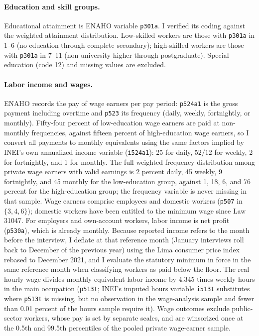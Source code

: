 \paragraph{Education and skill groups.} Educational attainment is ENAHO variable \texttt{p301a}. I verified its coding against the weighted attainment distribution. Low-skilled workers are those with \texttt{p301a} in 1--6 (no education through complete secondary); high-skilled workers are those with \texttt{p301a} in 7--11 (non-university higher through postgraduate). Special education (code 12) and missing values are excluded.

\paragraph{Labor income and wages.} ENAHO records the pay of wage earners per pay period: \texttt{p524a1} is the gross payment including overtime and \texttt{p523} its frequency (daily, weekly, fortnightly, or monthly). Fifty-four percent of low-education wage earners are paid at non-monthly frequencies, against fifteen percent of high-education wage earners, so I convert all payments to monthly equivalents using the same factors implied by INEI's own annualized income variable (\texttt{i524a1}): 25 for daily, $52/12$ for weekly, 2 for fortnightly, and 1 for monthly. The full weighted frequency distribution among private wage earners with valid earnings is 2 percent daily, 45 weekly, 9 fortnightly, and 45 monthly for the low-education group, against 1, 18, 6, and 76 percent for the high-education group; the frequency variable is never missing in that sample. Wage earners comprise employees and domestic workers (\texttt{p507} in $\{3,4,6\}$); domestic workers have been entitled to the minimum wage since Law 31047. For employers and own-account workers, labor income is net profit (\texttt{p530a}), which is already monthly. Because reported income refers to the month before the interview, I deflate at that reference month (January interviews roll back to December of the previous year) using the Lima consumer price index rebased to December 2021, and I evaluate the statutory minimum in force in the same reference month when classifying workers as paid below the floor. The real hourly wage divides monthly-equivalent labor income by $4.345$ times weekly hours in the main occupation (\texttt{p513t}; INEI's imputed hours variable \texttt{i513t} substitutes where \texttt{p513t} is missing, but no observation in the wage-analysis sample and fewer than 0.01 percent of the hours sample require it). Wage outcomes exclude public-sector workers, whose pay is set by separate scales, and are winsorized once at the 0.5th and 99.5th percentiles of the pooled private wage-earner sample.

